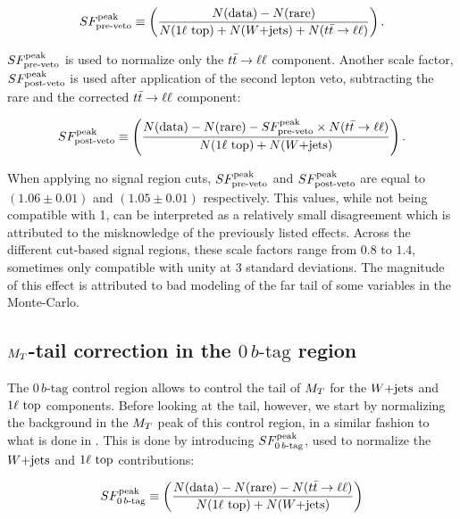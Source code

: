     \begin{equation}
        SF_{\text{pre-veto}}^{\text{peak}}
        \equiv
        \left(
            \frac{N(\text{data}) - N(\text{rare})}
                 {N(1\ell~\text{top}) + N(\text{$W$+jets}) + N(t\bar{t} \rightarrow \ell \ell)}
        \right).
        \label{eq:SFpreDefinition}
    \end{equation}

    $SF_{\text{pre-veto}}^{\text{peak}}$ is used to normalize only the $t\bar{t} \rightarrow \ell \ell$ component. Another
    scale factor, $SF_{\text{post-veto}}^{\text{peak}}$ is used after application of the second lepton veto,
    subtracting the rare and the corrected $t\bar{t} \rightarrow \ell \ell$ component:

    \begin{equation}
        SF_{\text{post-veto}}^{\text{peak}}
        \equiv
        \left(
            \frac{N(\text{data}) - N(\text{rare}) - SF_{\text{pre-veto}}^{\text{peak}} \times N(t\bar{t} \rightarrow \ell \ell)}
                 {N(1\ell~\text{top}) + N(\text{$W$+jets})}
        \right).
        \label{eq:SFpostDefinition}
    \end{equation}

     When applying no signal region cuts, $SF_{\text{pre-veto}}^{\text{peak}}$ and $SF_{\text{post-veto}}^{\text{peak}}$ are equal to
     $(1.06 \pm 0.01)$ and $(1.05 \pm 0.01)$ respectively. This values, while
     not being compatible with 1, can be interpreted as a relatively small
     disagreement which is attributed to the misknowledge of the previously
     listed effects. Across the different cut-based signal regions, these scale
     factors range from $0.8$ to $1.4$, sometimes only compatible with unity at
     3 standard deviations. The magnitude of this effect is attributed to bad
     modeling of the far tail of some variables in the Monte-Carlo.

        \subsection{$M_T$-tail correction in the $0\, b\text{-tag}$ region \label{sec:MTtailCorrection}}

    The $0\, b\text{-tag}$ control region allows to control the tail of $M_T$
    for the $\text{$W$+jets}$ and $1\ell~\text{top}$ components. Before looking at the tail,
    however, we start by normalizing the background in the $M_T$ peak of this
    control region, in a similar fashion to what is done in
    . This is done by introducing
    $SF_{0\, b\text{-tag}}^{\text{peak}}$, used to normalize the $\text{$W$+jets}$ and $1\ell~\text{top}$
    contributions:

    \begin{equation}
        SF_{0\, b\text{-tag}}^{\text{peak}}
        \equiv
        \left(
            \frac{N(\text{data}) - N(\text{rare}) - N(t\bar{t} \rightarrow \ell \ell)}
                 {N(1\ell~\text{top}) + N(\text{$W$+jets})}
        \right)
        \label{eq:SF0btagDefinition}
    \end{equation}


